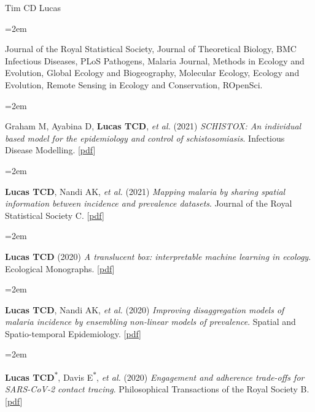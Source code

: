 \documentclass{scrartcl}
\newcommand{\MarginText}[1]{\marginpar{\raggedleft\itshape\small#1}} %
\newcommand{\Description}[1]{\hangindent=2em\hangafter=0\noindent\raggedright\footnotesize{#1}\par\normalsize\vspace{1em}} %
\begin{document}
\begin{cv}{Tim {\Large CD} Lucas}
\vspace{-0.5em} %


\Description{Journal of the Royal Statistical Society, Journal of Theoretical Biology, BMC Infectious Diseases, PLoS Pathogens, Malaria Journal, Methods in Ecology and Evolution, Global Ecology and Biogeography, Molecular Ecology, Ecology and Evolution, Remote Sensing in Ecology and Conservation, ROpenSci.}




\vspace{1em} %

{\color{Maroon}}\vspace{1em}


\Description{\MarginText{2021}Graham M, Ayabina D, \textbf{Lucas TCD}, \emph{et al.} (2021) \emph{SCHISTOX: An individual based model for the epidemiology and control of schistosomiasis}. Infectious Disease Modelling. [\href{https://www.sciencedirect.com/science/article/pii/S2468042721000130}{pdf}]}

\Description{\textbf{Lucas TCD}, Nandi AK,  \emph{et al.} (2021) \emph{Mapping malaria by sharing spatial information between incidence and prevalence datasets}. Journal of the Royal Statistical Society C. [\href{https://rss.onlinelibrary.wiley.com/doi/full/10.1111/rssc.12484}{pdf}]}

\Description{\MarginText{2020}\textbf{Lucas TCD} (2020) \emph{A translucent box: interpretable machine learning in ecology}. Ecological Monographs. [\href{https://esajournals.onlinelibrary.wiley.com/doi/epdf/10.1002/ecm.1422}{pdf}]}


\Description{\textbf{Lucas TCD}, Nandi AK,  \emph{et al.} (2020) \emph{ Improving disaggregation models of malaria incidence by ensembling non-linear models of prevalence}. Spatial and Spatio-temporal Epidemiology. [\href{https://reader.elsevier.com/reader/sd/pii/S1877584520300356?token=A7B0EF0114C0A057AD7F1E13B7F97FE4D359B945C1F09211AC50B77D272216014E3E9881E3FBFC7D3CA8A8DD5A78846A}{pdf}]}

\Description{\textbf{Lucas TCD}\textsuperscript{$\ast$}, Davis E\textsuperscript{$\ast$}, \emph{et al.} (2020) \emph{Engagement and adherence trade-offs for SARS-CoV-2 contact tracing}. Philosophical Transactions of the Royal Society B. [\href{https://royalsocietypublishing.org/doi/10.1098/rstb.2020.0270}{pdf}]}



\end{cv}
\end{document}
